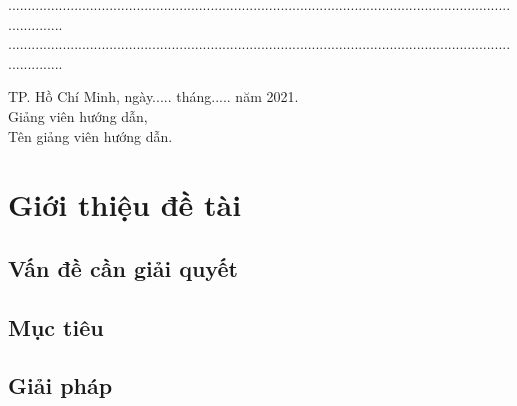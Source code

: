 \documentclass[12pt,a4paper,2sides]{report}
\newcommand{\gvhd}{Tên giảng viên hướng dẫn} %
\newcommand{\nam}{2021}
\begin{document}
	...............................................................................................................................................\\
	...............................................................................................................................................
\begin{center}
	\hspace*{5cm} TP. Hồ Chí Minh, ngày..... tháng..... năm \nam.\\
	\hspace*{5cm} Giảng viên hướng dẫn,\\
	\vspace*{2cm}
	\hspace*{5cm} \gvhd.
\newpage
\end{center}

\newpage
\clearpage
\dominitoc
\tableofcontents %
\newpage
\clearpage
\clearpage
{}
\setcounter{page}{1}
\clearpage
%


\newpage
\section{Giới thiệu đề tài} %
\subsection{Vấn đề cần giải quyết} %
\subsection{Mục tiêu} %
\subsection{Giải pháp} %
\end{document}
